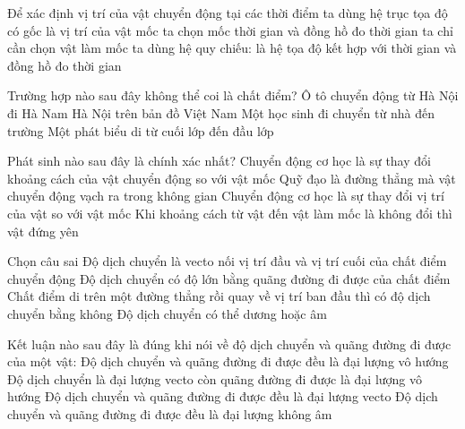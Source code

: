 \documentclass[Main.tex]{subfiles}
\begin{document}
	\begin{ex}
		[NB] Để xác định vị trí của vật chuyển động tại các thời điểm
		\choice
		{ta dùng hệ trục tọa độ có gốc là vị trí của vật mốc}
		{ta chọn mốc thời gian và đồng hồ đo thời gian}
		{ta chỉ cần chọn vật làm mốc}
		{ta dùng hệ quy chiếu: là hệ tọa độ kết hợp với thời gian và đồng hồ đo thời gian}
		\loigiai{}
	\end{ex}
	
	\begin{ex}
		[NB] Trường hợp nào sau đây không thể coi là chất điểm?
		\choice
		{Ô tô chuyển động từ Hà Nội đi Hà Nam}
		{Hà Nội trên bản đồ Việt Nam}
		{Một học sinh đi chuyển từ nhà đến trường}
		{Một phát biểu di từ cuối lớp đến đầu lớp}
		\loigiai{}
	\end{ex}
	
	\begin{ex}
		[NB] Phát sinh nào sau đây là chính xác nhất?
		\choice
		{Chuyển động cơ học là sự thay đổi khoảng cách của vật chuyển động so với vật mốc}
		{Quỹ đạo là đường thẳng mà vật chuyển động vạch ra trong không gian}
		{Chuyển động cơ học là sự thay đổi vị trí của vật so với vật mốc}
		{Khi khoảng cách từ vật đến vật làm mốc là không đổi thì vật đứng yên}
		\loigiai{}
	\end{ex}
	
	\begin{ex}
		[NB] Chọn câu sai
		\choice
		{Độ dịch chuyển là vecto nối vị trí đầu và vị trí cuối của chất điểm chuyển động}
		{Độ dịch chuyển có độ lớn bằng quãng đường đi được của chất điểm}
		{Chất điểm di trên một đường thẳng rồi quay về vị trí ban đầu thì có độ dịch chuyển bằng không}
		{Độ dịch chuyển có thể dương hoặc âm}
		\loigiai{}
	\end{ex}
	
	\begin{ex}
		[TH] Kết luận nào sau đây là đúng khi nói về độ dịch chuyển và quãng đường đi được của một vật:
		\choice
		{Độ dịch chuyển và quãng đường đi được đều là đại lượng vô hướng}
		{Độ dịch chuyển là đại lượng vecto còn quãng đường đi được là đại lượng vô hướng}
		{Độ dịch chuyển và quãng đường đi được đều là đại lượng vecto}
		{Độ dịch chuyển và quãng đường đi được đều là đại lượng không âm}
		\loigiai{}
	\end{ex}
	
\end{document}

